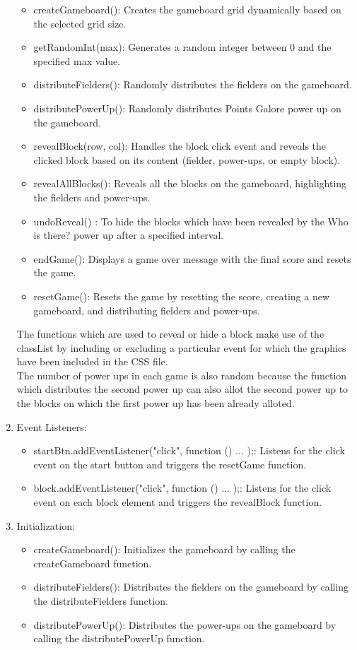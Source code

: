 \documentclass{article}
\begin{document}
\begin{enumerate}
\begin{itemize}
    \item createGameboard(): Creates the gameboard grid dynamically based on the selected grid size.
    \item getRandomInt(max): Generates a random integer between 0 and the specified max value.
    \item distributeFielders(): Randomly distributes the fielders on the gameboard.
    \item distributePowerUp(): Randomly distributes Points Galore power up on the gameboard.
    \item revealBlock(row, col): Handles the block click event and reveals the clicked block based on its content (fielder, power-ups, or empty block).
    \item revealAllBlocks(): Reveals all the blocks on the gameboard, highlighting the fielders and power-ups.
    \item undoReveal() : To hide the blocks which have been revealed by the Who is there? power up after a specified interval.
    \item endGame(): Displays a game over message with the final score and resets the game.
    \item resetGame(): Resets the game by resetting the score, creating a new gameboard, and distributing fielders and power-ups.
\end{itemize}
The functions which are used to reveal or hide a block make use of the classList by including or excluding a particular event for which the graphics have been included in the CSS file. \\ The number of power ups in each game is also random because the function which distributes the second power up can also allot the second power up to the blocks on which the first power up has been already alloted.
\item Event Listeners:
\begin{itemize}


    \item startBtn.addEventListener("click", function () { ... });: Listens for the click event on the start button and triggers the resetGame function.
    \item block.addEventListener("click", function () { ... });: Listens for the click event on each block element and triggers the revealBlock function.
\end{itemize}
\item Initialization:
\begin{itemize}


    \item createGameboard(): Initializes the gameboard by calling the createGameboard function.
    \item distributeFielders(): Distributes the fielders on the gameboard by calling the distributeFielders function.
    \item distributePowerUp(): Distributes the power-ups on the gameboard by calling the distributePowerUp function.
\end{itemize}
\end{enumerate}
\end{document}
